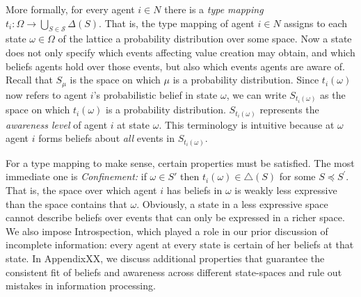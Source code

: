\documentclass[
11pt,
titlepage,
reqno,
]{article}%
\theoremstyle{definition}
\begin{document}
	More formally, for every agent $i \in N$ there is a \textit{type mapping} $t_{i}: \Omega \longrightarrow \bigcup_{S \in \mathcal{S}} \Delta(S)$. That is, the type mapping of agent $i \in N$ assigns to each state $\omega \in \Omega$ of the lattice a probability distribution over some space. Now a state does not only specify which events affecting value creation may obtain, and which beliefs agents hold over those events, but also which events agents are aware of. Recall that $S_{\mu}$ is the space on which $\mu$ is a probability distribution. Since $t_i(\omega)$ now refers to agent $i$'s probabilistic belief in state $\omega$, we can write $S_{t_i(\omega)}$ as the space on which $t_i(\omega)$ is a probability distribution. $S_{t_i(\omega)}$ represents the \emph{awareness level} of agent $i$ at state $\omega$. This terminology is intuitive because at $\omega$ agent $i$ forms beliefs about \textit{all} events in $S_{t_i(\omega)}$.
	
	For a type mapping to make sense, certain properties must be satisfied. The most immediate one is \textit{Confinement:} if $\omega \in S'$ then $t_{i}(\omega )\in \triangle \left( S \right)$ for some $S \preceq S^{\prime}$. That is, the space over which agent $i$ has beliefs in $\omega$ is weakly less expressive than the space contains that $\omega$. Obviously,  a state in a less expressive space cannot describe beliefs over events that can only be expressed in a richer space.  We also impose Introspection, which played a role in our prior discussion of incomplete information: every agent at every state is certain of her beliefs at that state. In AppendixXX, we discuss additional properties that guarantee the consistent fit of beliefs and awareness across different state-spaces and rule out mistakes in information processing.
	
\end{document}
